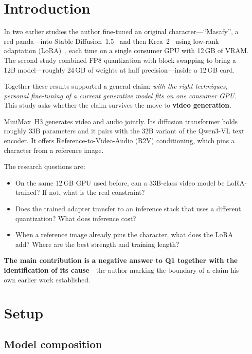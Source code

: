 \documentclass[10pt,twocolumn]{article}
\begin{document}
\section{Introduction}

In two earlier studies the author fine-tuned an original character---``Masafy'', a red panda---into Stable Diffusion~1.5~\cite{suzuki2026sd15lora} and then Krea~2~\cite{suzuki2026krea2lora} using low-rank adaptation (LoRA)~\cite{hu2022lora}, each time on a single consumer GPU with 12\,GB of VRAM. The second study combined FP8 quantization with block swapping to bring a 12B model---roughly 24\,GB of weights at half precision---inside a 12\,GB card.

Together these results supported a general claim: \emph{with the right techniques, personal fine-tuning of a current generative model fits on one consumer GPU.} This study asks whether the claim survives the move to \textbf{video generation}.

MiniMax~H3 generates video and audio jointly. Its diffusion transformer holds roughly 33B parameters and it pairs with the 32B variant of the Qwen3-VL text encoder. It offers Reference-to-Video-Audio (R2V) conditioning, which pins a character from a reference image.

The research questions are:

\begin{itemize}[leftmargin=2.2em,topsep=2pt,itemsep=1pt]
  \item[\textbf{Q1.}] On the same 12\,GB GPU used before, can a 33B-class video model be LoRA-trained? If not, what is the real constraint?
  \item[\textbf{Q2.}] Does the trained adapter transfer to an inference stack that uses a different quantization? What does inference cost?
  \item[\textbf{Q3.}] When a reference image already pins the character, what does the LoRA add? Where are the best strength and training length?
\end{itemize}

\textbf{The main contribution is a negative answer to Q1 together with the identification of its cause}---the author marking the boundary of a claim his own earlier work established.

\section{Setup}

\subsection{Model composition}
\end{document}
